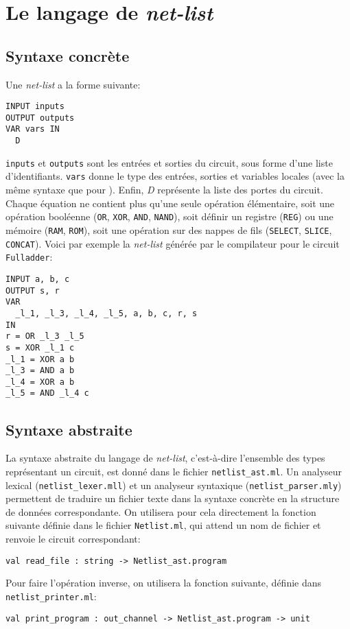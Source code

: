 \documentclass[a4paper]{article}
\begin{document}
\section{Le langage de \emph{net-list}}

\subsection{Syntaxe concrète}

Une \emph{net-list} a la forme suivante:
\begin{lstlisting}[language=nl]
INPUT inputs
OUTPUT outputs
VAR vars IN
  D
\end{lstlisting}
\texttt{inputs} et \texttt{outputs} sont les entrées et sorties du circuit, sous forme d'une liste d'identifiants. \texttt{vars} donne le type des entrées, sorties et variables locales (avec la même syntaxe que pour \minijazz{}). Enfin, \emph{D} représente la liste des portes du circuit. Chaque équation ne contient plus qu'une seule opération élémentaire, soit une opération booléenne (\texttt{OR}, \texttt{XOR}, \texttt{AND}, \texttt{NAND}), soit définir un registre (\texttt{REG}) ou une mémoire (\texttt{RAM}, \texttt{ROM}), soit une opération sur des nappes de fils (\texttt{SELECT}, \texttt{SLICE}, \texttt{CONCAT}). Voici par exemple la \emph{net-list} générée par le compilateur pour le circuit \texttt{Fulladder}:
\begin{lstlisting}
INPUT a, b, c
OUTPUT s, r
VAR
  _l_1, _l_3, _l_4, _l_5, a, b, c, r, s
IN
r = OR _l_3 _l_5
s = XOR _l_1 c
_l_1 = XOR a b
_l_3 = AND a b
_l_4 = XOR a b
_l_5 = AND _l_4 c
\end{lstlisting}

\subsection{Syntaxe abstraite}

La syntaxe abstraite du langage de \emph{net-list}, c'est-à-dire l'ensemble des types représentant un circuit, est donné dans le fichier \texttt{netlist\_ast.ml}. Un analyseur lexical (\texttt{netlist\_lexer.mll}) et un analyseur syntaxique (\texttt{netlist\_parser.mly}) permettent de traduire un fichier texte dans la syntaxe concrète en la structure de données correspondante. On utilisera pour cela directement la fonction suivante définie dans le fichier \texttt{Netlist.ml}, qui attend un nom de fichier et renvoie le circuit correspondant:
\begin{lstlisting}[language={[objective]caml}]
val read_file : string -> Netlist_ast.program
\end{lstlisting}

Pour faire l'opération inverse, on utilisera la fonction suivante, définie dans \texttt{netlist\_printer.ml}:
\begin{lstlisting}[language={[objective]caml}, xrightmargin=0.5cm]
val print_program : out_channel -> Netlist_ast.program -> unit
\end{lstlisting}
\end{document}
